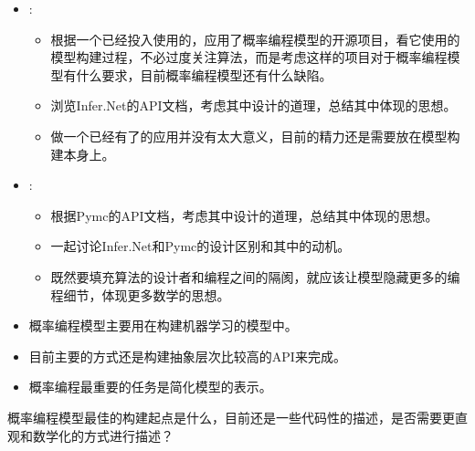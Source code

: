 \begin{itemize}
\item \RenZH:
    \begin{itemize}
    \item 根据一个已经投入使用的，应用了概率编程模型的开源项目，看它使用的模型构建过程，不必过度关注算法，而是考虑这样的项目对于概率编程模型有什么要求，目前概率编程模型还有什么缺陷。
    \item 浏览Infer.Net的API文档，考虑其中设计的道理，总结其中体现的思想。
    \item 做一个已经有了的应用并没有太大意义，目前的精力还是需要放在模型构建本身上。
    \end{itemize}
\item \TangLT:
    \begin{itemize}
        \item 根据Pymc的API文档，考虑其中设计的道理，总结其中体现的思想。
        \item 一起讨论Infer.Net和Pymc的设计区别和其中的动机。
        \item 既然要填充算法的设计者和编程之间的隔阂，就应该让模型隐藏更多的编程细节，体现更多数学的思想。
    \end{itemize}
\end{itemize}


\begin{itemize}
    \item 概率编程模型主要用在构建机器学习的模型中。
    \item 目前主要的方式还是构建抽象层次比较高的API来完成。
    \item 概率编程最重要的任务是简化模型的表示。
\end{itemize}


概率编程模型最佳的构建起点是什么，目前还是一些代码性的描述，是否需要更直观和数学化的方式进行描述？